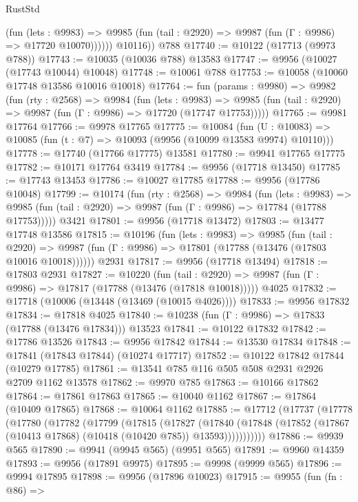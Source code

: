 \begin{lexlean}{RustStd}
\begin{coremodule}
              (fun (lets : @9983) =>
              @9985 (fun (tail : @2920) => @9987 (fun (Γ : @9986) => @17720 @10070))))))
        @10116))
    @788
@17740 := @10122 (@17713 (@9973 @788))
@17743 := @10035 (@10036 @788) @13583
@17747 := @9956 (@10027 (@17743 @10044) @10048)
@17748 := @10061 @788
@17753 := @10058 (@10060 @17748 @13586 @10016 @10018)
@17764 := fun (params : @9980) =>
  @9982
    (fun (rty : @2568) =>
    @9984
      (fun (lets : @9983) =>
      @9985 (fun (tail : @2920) => @9987 (fun (Γ : @9986) => @17720 (@17747 @17753)))))
@17765 := @9981 @17764
@17766 := @9978 @17765
@17775 := @10084
    (fun (U : @10083) => @10085 (fun (t : @7) => @10093 (@9956 (@10099 @13583 @9974) @10110)))
@17778 := @17740 (@17766 @17775) @13581
@17780 := @9941 @17765 @17775
@17782 := @10171 @17764 @3419
@17784 := @9956 (@17718 @13450)
@17785 := @17743 @13453
@17786 := @10027 @17785
@17788 := @9956 (@17786 @10048)
@17799 := @10174
    (fun (rty : @2568) =>
    @9984
      (fun (lets : @9983) =>
      @9985 (fun (tail : @2920) => @9987 (fun (Γ : @9986) => @17784 (@17788 @17753)))))
    @3421
@17801 := @9956 (@17718 @13472)
@17803 := @13477 @17748 @13586
@17815 := @10196
    (fun (lets : @9983) =>
    @9985
      (fun (tail : @2920) =>
      @9987 (fun (Γ : @9986) => @17801 (@17788 (@13476 (@17803 @10016 @10018))))))
    @2931
@17817 := @9956 (@17718 @13494)
@17818 := @17803 @2931
@17827 := @10220
    (fun (tail : @2920) => @9987 (fun (Γ : @9986) => @17817 (@17788 (@13476 (@17818 @10018)))))
    @4025
@17832 := @17718 (@10006 (@13448 (@13469 (@10015 @4026))))
@17833 := @9956 @17832
@17834 := @17818 @4025
@17840 := @10238 (fun (Γ : @9986) => @17833 (@17788 (@13476 @17834))) @13523
@17841 := @10122 @17832
@17842 := @17786 @13526
@17843 := @9956 @17842
@17844 := @13530 @17834
@17848 := @17841 (@17843 @17844) (@10274 @17717)
@17852 := @10122 @17842 @17844 (@10279 @17785)
@17861 := @13541 @785 @116 @505 @508 @2931 @2926 @2709 @1162 @13578
@17862 := @9970 @785
@17863 := @10166 @17862
@17864 := @17861 @17863
@17865 := @10040 @1162
@17867 := @17864 (@10409 @17865)
@17868 := @10064 @1162
@17885 := @17712
    (@17737
      (@17778
        (@17780
          (@17782
            (@17799
              (@17815
                (@17827
                  (@17840
                    (@17848 (@17852 (@17867 (@10413 @17868) (@10418 (@10420 @785)) @13593)))))))))))
@17886 := @9939 @565
@17890 := @9941 (@9945 @565) (@9951 @565)
@17891 := @9960 @14359
@17893 := @9956 (@17891 @9975)
@17895 := @9998 (@9999 @565)
@17896 := @9994 @17895
@17898 := @9956 (@17896 @10023)
@17915 := @9955
    (fun (fn : @86) =>

\end{coremodule}
\end{lexlean}
